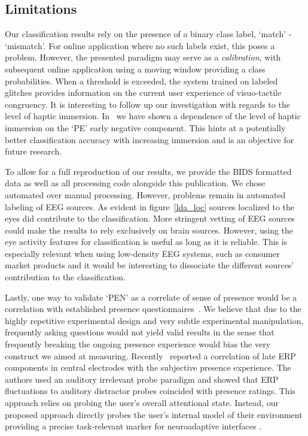 \subsection{Limitations}

Our classification results rely on the presence of a binary class label, `match' - `mismatch'. For online application where no such labels exist, this poses a problem. However, the presented paradigm may serve as a \textit{calibration}, with subsequent online application using a moving window providing a class probabilities. When a threshold is exceeded, the system trained on labeled glitches provides information on the current user experience of visuo-tactile congruency. It is interesting to follow up our investigation with regards to the level of haptic immersion. In~\cite{Gehrke2019-og} we have shown a dependence of the level of haptic immersion on the `PE' early negative component. This hints at a potentially better classification accuracy with increasing immersion and is an objective for future research.

To allow for a full reproduction of our results, we provide the BIDS formatted data as well as all processing code alongside this publication. We chose automated over manual processing. However, problems remain in automated labeling of EEG sources. As evident in figure~\ref{lda_loc} sources localized to the eyes did contribute to the classification. More stringent vetting of EEG sources could make the results to rely exclusively on brain sources. However, using the eye activity features for classification is useful as long as it is reliable. This is especially relevant when using low-density EEG systems, such as consumer market products and it would be interesting to dissociate the different sources' contribution to the classification.

Lastly, one way to validate `PEN' as a correlate of sense of presence would be a correlation with established presence questionnaires~\cite{Witmer1998-ew,Schubert2003-sq}. We believe that due to the highly repetitive experimental design and very subtle experimental manipulation, frequently asking questions would not yield valid results in the sense that frequently breaking the ongoing presence experience would bias the very construct we aimed at measuring. Recently~\cite{Grassini2021-tc} reported a correlation of late ERP components in central electrodes with the subjective presence experience. The authors used an auditory irrelevant probe paradigm and showed that ERP fluctuations to auditory distractor probes coincided with presence ratings. This approach relies on probing the user's overall attentional state. Instead, our proposed approach directly probes the user's internal model of their environment providing a precise task-relevant marker for neuroadaptive interfaces \cite{Krol2020-lj}.


